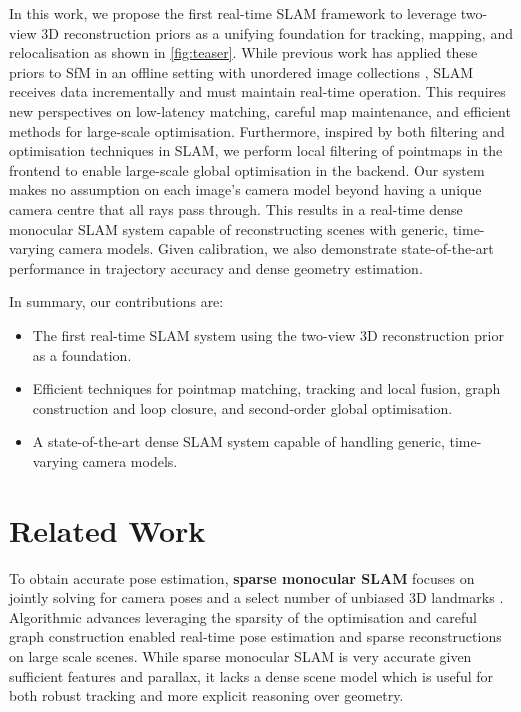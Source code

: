 \documentclass[10pt,twocolumn,letterpaper]{article}
\begin{document}
In this work, we propose the first real-time SLAM framework to leverage two-view 3D reconstruction priors as a unifying foundation for tracking, mapping, and relocalisation as shown in \cref{fig:teaser}.  While previous work has applied these priors to SfM in an offline setting with unordered image collections \cite{duisterhof_2024_mast3rsfm}, SLAM receives data incrementally and must maintain real-time operation.  This requires new perspectives on low-latency matching, careful map maintenance, and efficient methods for large-scale optimisation.  Furthermore, inspired by both filtering and optimisation techniques in SLAM, we perform local filtering of pointmaps in the frontend to enable large-scale global optimisation in the backend.  Our system makes no assumption on each image's camera model beyond having a unique camera centre that all rays pass through.  This results in a real-time dense monocular SLAM system capable of reconstructing scenes with generic, time-varying camera models.  Given calibration, we also demonstrate state-of-the-art performance in trajectory accuracy and dense geometry estimation.

In summary, our contributions are:
\begin{itemize}
    \item The first real-time SLAM system using the two-view 3D reconstruction prior \master \cite{leroy_mast3r_eccv24} as a foundation.
    \item Efficient techniques for pointmap matching, tracking and local fusion, graph construction and loop closure, and second-order global  optimisation.
    \item A state-of-the-art dense SLAM system capable of handling generic, time-varying camera models.
\end{itemize}

\section{Related Work}
\label{sec:related_work}

To obtain accurate pose estimation, \textbf{sparse monocular SLAM} focuses on jointly solving for camera poses and a select number of unbiased 3D landmarks \cite{davison_monoslam_2007}.  Algorithmic advances leveraging the sparsity of the optimisation \cite{klein_parallel_2007} and careful graph construction \cite{mur-artal_orb-slam_2015} enabled real-time pose estimation and sparse reconstructions on large scale scenes.  While sparse monocular SLAM is very accurate given sufficient features and parallax, it lacks a dense scene model which is useful for both robust tracking and more explicit reasoning over geometry.
\end{document}
